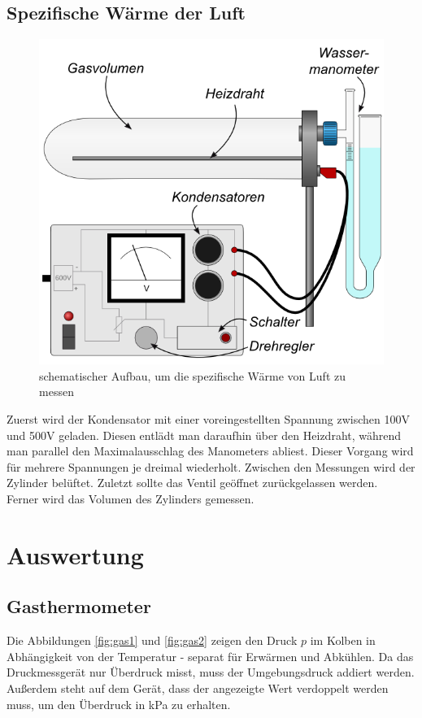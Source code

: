 \documentclass[12pt,a4paper,titlepage,headinclude,bibtotoc]{scrartcl}
\begin{document}
\subsection{Spezifische Wärme der Luft}
\begin{figure}[!htb]
 \centering
 \includegraphics[scale=0.7]{SpezWaermeSkizze.jpg}
 \caption{schematischer Aufbau, um die spezifische Wärme von Luft zu messen \cite{lp}}
 \label{fig:SWLSkizze}
\end{figure}
Zuerst wird der Kondensator mit einer voreingestellten Spannung zwischen 100V und 500V geladen.
Diesen entlädt man daraufhin über den Heizdraht, während man parallel den Maximalausschlag des Manometers abliest.
Dieser Vorgang wird für mehrere Spannungen je dreimal wiederholt.
Zwischen den Messungen wird der Zylinder belüftet.
Zuletzt sollte das Ventil geöffnet zurückgelassen werden.\\
Ferner wird das Volumen des Zylinders gemessen.

\section{Auswertung}
\label{sec:auswertung}

\subsection{Gasthermometer}
Die Abbildungen \ref{fig:gas1} und \ref{fig:gas2} zeigen den Druck $p$ im Kolben in Abhängigkeit von der Temperatur - separat für Erwärmen und Abkühlen.
Da das Druckmessgerät nur Überdruck misst, muss der Umgebungsdruck addiert werden.
Außerdem steht auf dem Gerät, dass der angezeigte Wert verdoppelt werden muss, um den Überdruck in kPa zu erhalten.\\
\end{document}

